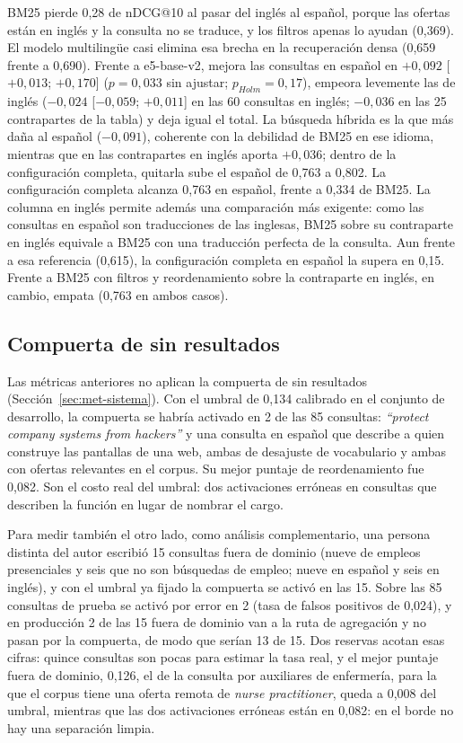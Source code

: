 BM25 pierde 0,28 de nDCG@10 al pasar del inglés al español, porque las ofertas están en inglés y la consulta no se traduce, y los filtros apenas lo ayudan (0,369). El modelo multilingüe casi elimina esa brecha en la recuperación densa (0,659 frente a 0,690). Frente a e5-base-v2, mejora las consultas en español en $+0{,}092$ [$+0{,}013$; $+0{,}170$] ($p = 0{,}033$ sin ajustar; $p_{Holm} = 0{,}17$), empeora levemente las de inglés ($-0{,}024$ [$-0{,}059$; $+0{,}011$] en las 60 consultas en inglés; $-0{,}036$ en las 25 contrapartes de la tabla) y deja igual el total. La búsqueda híbrida es la que más daña al español ($-0{,}091$), coherente con la debilidad de BM25 en ese idioma, mientras que en las contrapartes en inglés aporta $+0{,}036$; dentro de la configuración completa, quitarla sube el español de 0,763 a 0,802. La configuración completa alcanza 0,763 en español, frente a 0,334 de BM25. La columna en inglés permite además una comparación más exigente: como las consultas en español son traducciones de las inglesas, BM25 sobre su contraparte en inglés equivale a BM25 con una traducción perfecta de la consulta. Aun frente a esa referencia (0,615), la configuración completa en español la supera en 0,15. Frente a BM25 con filtros y reordenamiento sobre la contraparte en inglés, en cambio, empata (0,763 en ambos casos).

\subsection{Compuerta de sin resultados}

Las métricas anteriores no aplican la compuerta de sin resultados (Sección~\ref{sec:met-sistema}). Con el umbral de 0,134 calibrado en el conjunto de desarrollo, la compuerta se habría activado en 2 de las 85 consultas: \textit{\enquote{protect company systems from hackers}} y una consulta en español que describe a quien construye las pantallas de una web, ambas de desajuste de vocabulario y ambas con ofertas relevantes en el corpus. Su mejor puntaje de reordenamiento fue 0,082. Son el costo real del umbral: dos activaciones erróneas en consultas que describen la función en lugar de nombrar el cargo.

Para medir también el otro lado, como análisis complementario, una persona distinta del autor escribió 15 consultas fuera de dominio (nueve de empleos presenciales y seis que no son búsquedas de empleo; nueve en español y seis en inglés), y con el umbral ya fijado la compuerta se activó en las 15. Sobre las 85 consultas de prueba se activó por error en 2 (tasa de falsos positivos de 0,024), y en producción 2 de las 15 fuera de dominio van a la ruta de agregación y no pasan por la compuerta, de modo que serían 13 de 15. Dos reservas acotan esas cifras: quince consultas son pocas para estimar la tasa real, y el mejor puntaje fuera de dominio, 0,126, el de la consulta por auxiliares de enfermería, para la que el corpus tiene una oferta remota de \textit{nurse practitioner}, queda a 0,008 del umbral, mientras que las dos activaciones erróneas están en 0,082: en el borde no hay una separación limpia.

